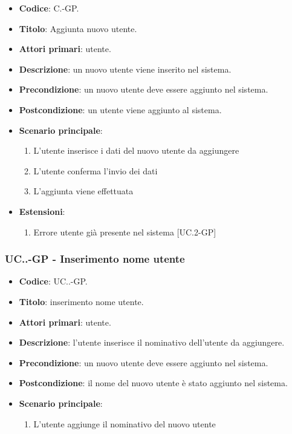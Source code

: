 		\begin{itemize}
			\item \textbf{Codice}: C\theuccount.\thesubuccount-GP.
			\item \textbf{Titolo}: Aggiunta nuovo utente.
			\item \textbf{Attori primari}: utente.
			\item \textbf{Descrizione}: un nuovo utente viene inserito nel sistema.
			\item \textbf{Precondizione}: un nuovo utente deve essere aggiunto nel sistema.
			\item \textbf{Postcondizione}: un utente viene aggiunto al sistema.
			\item \textbf{Scenario principale}:
			\begin{enumerate}
				\item L'utente inserisce i dati del nuovo utente da aggiungere
				\item L'utente conferma l'invio dei dati
				\item L'aggiunta viene effettuata
			\end{enumerate}
			\item \textbf{Estensioni}:
			\begin{enumerate}
				\item Errore utente già presente nel sistema [UC\theuccount.2-GP]
			\end{enumerate}
		\end{itemize}

		\subsubsection{UC\theuccount.\thesubuccount.\thesubsubuccount-GP - Inserimento nome utente}

			\begin{itemize}
				\item \textbf{Codice}: UC\theuccount.\thesubuccount.\thesubsubuccount-GP.
				\item \textbf{Titolo}: inserimento nome utente.
				\item \textbf{Attori primari}: utente.
				\item \textbf{Descrizione}: l'utente inserisce il nominativo dell'utente da aggiungere.
				\item \textbf{Precondizione}: un nuovo utente deve essere aggiunto nel sistema.
				\item \textbf{Postcondizione}: il nome del nuovo utente è stato aggiunto nel sistema.
				\item \textbf{Scenario principale}:
				\begin{enumerate}
					\item L'utente aggiunge il nominativo del nuovo utente
				\end{enumerate}
			\end{itemize}

